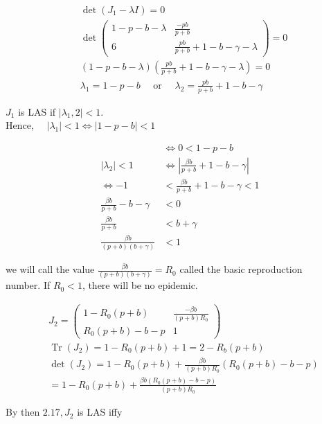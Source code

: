 \documentclass[10pt]{article}
\begin{document}
$$
\begin{aligned}
& \operatorname{det}\left(J_{1}-\lambda I\right)=0 \\
& \operatorname{det}\left(\begin{array}{cc}
1-p-b-\lambda & \frac{-p b}{p+b} \\
6 & \frac{p b}{p+b}+1-b-\gamma-\lambda
\end{array}\right)=0 \\
& (1-p-b-\lambda)\left(\frac{p b}{p+b}+1-b-\gamma-\lambda\right)=0 \\
& \lambda_{1}=1-p-b \quad \text { or } \quad \lambda_{2}=\frac{p b}{p+b}+1-b-\gamma
\end{aligned}
$$

$J_{1}$ is LAS if $\left|\lambda_{1}, 2\right|<1$.\\
Hence, $\quad\left|\lambda_{1}\right|<1 \Leftrightarrow|1-p-b|<1$

$$
\begin{aligned}
& \Leftrightarrow 0<1-p-b \\
\left|\lambda_{2}\right|<1 & \Leftrightarrow\left|\frac{\beta b}{p+b}+1-b-\gamma\right| \\
\Leftrightarrow-1 & <\frac{\beta b}{p+b}+1-b-\gamma<1 \\
\frac{\beta b}{p+b}-b-\gamma & <0 \\
\frac{\beta b}{p+b} & <b+\gamma \\
\frac{\beta b}{(p+b)(b+\gamma)} & <1
\end{aligned}
$$

we will call the value $\frac{\beta b}{(p+b)(b+\gamma)}=R_{0}$ called the basic reproduction\\
number. If $R_{0}<1$, there will be no epidemic.

$$
\begin{aligned}
& J_{2}=\left(\begin{array}{cc}
1-R_{0}(p+b) & \frac{-\beta b}{(p+b) R_{0}} \\
R_{0}(p+b)-b-p & 1
\end{array}\right) \\
& \operatorname{Tr}\left(J_{2}\right)=1-R_{0}(p+b)+1=2-R_{b}(p+b) \\
& \operatorname{det}\left(J_{2}\right)=1-R_{0}(p+b)+\frac{\beta b}{(p+b) R_{0}}\left(R_{0}(p+b)-b-p\right) \\
&=1-R_{0}(p+b)+\frac{\beta b\left(R_{0}(p+b)-b-p\right)}{(p+b) R_{0}}
\end{aligned}
$$

By then $2.17, J_{2}$ is LAS iffy
\end{document}
